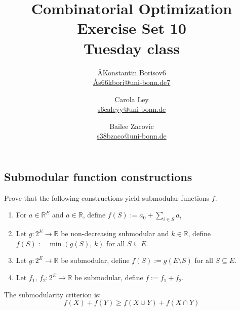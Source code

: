 \documentclass{article}
\title{Combinatorial Optimization \\ Exercise Set 10 \\ Tuesday class}
\author{
  \AA{Konstantin Borisov}{6} \\
  \href{mailto:\AA{s66kbori@uni-bonn.de}{7}}{\AA{s66kbori@uni-bonn.de}{7}}
  \and
  Carola Ley \\
  \href{mailto:s6caleyy@uni-bonn.de}{s6caleyy@uni-bonn.de}
  \and
  Bailee Zacovic \\
  \href{mailto:s38bzaco@uni-bonn.de}{s38bzaco@uni-bonn.de}
}
\newcommand{\R}{\mathbb{R}}
\begin{document}
  \maketitle

  \setcounter{section}{10}
  \subsection{Submodular function constructions}
  \begin{centerframebox}
    Prove that the following constructions yield submodular functions $f$.

    \begin{enumerate}[label=(\roman*)]
      \item For $a \in \R^E$ and $a \in \R$, define $f(S) := a_0 + \sum_{i\in S} a_i$
      \item Let $g: 2^E \to \R$ be non-decreasing submodular and $k \in \R$, define $f(S) := \min(g(S),\, k)$ for all $S \subseteq E$.
      \item Let $g: 2^E \to \R$ be submodular, define $f(S) := g(E \setminus S)$ for all $S \subseteq E$.
      \item Let $f_1,\, f_2 : 2^E \to \R$ be submodular, define $f := f_1 + f_2$.
    \end{enumerate}
  \end{centerframebox}
  The submodularity criterion is:
  \[ f(X) + f(Y) \geq f(X \cup Y) + f(X \cap Y) \]
\end{document}
